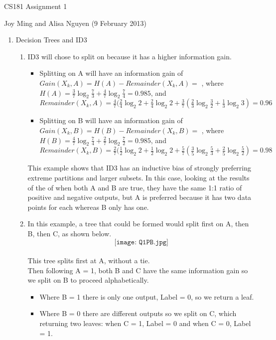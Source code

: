 \documentclass[11pt]{article}
\begin{document}
\begin{center}
\large
CS181 Assignment 1
\end{center}
Joy Ming and Alisa Nguyen (9 February 2013)\\

\begin{enumerate}
\setcounter{enumi}{0}

\item Decision Trees and ID3
\begin{enumerate}
\item ID3 will chose to split on  because it has a higher information gain.
	\begin{itemize}
	\item Splitting on A will have an information gain of $Gain(X_k,A)=H(A)-Remainder(X_k,A)=$ , 
		where $H(A) = \frac{3}{7}\log_2 \frac{7}{3} + \frac{4}{7}\log_2\frac{7}{4}=0.985$, %
		and $Remainder(X_k,A)=\frac{4}{7}(\frac{2}{4}\log_2 2+\frac{2}{4}\log_2 2+\frac{3}{7}(\frac{2}{3}\log_2 \frac{3}{2} + \frac{1}{3}\log_2 3) = 0.96$
	\item Splitting on B will have an information gain of $Gain(X_k,B)=H(B)-Remainder(X_k,B)=$ , 
		where $H(B) = \frac{4}{7}\log_2 \frac{7}{4} + \frac{2}{7}\log_2\frac{7}{2}=0.985$, %
		and $Remainder(X_k,B)=\frac{2}{7}(\frac{1}{2}\log_2 2+\frac{1}{2}\log_2 2+\frac{5}{7}(\frac{3}{5}\log_2 \frac{5}{3} + \frac{2}{5}\log_2 \frac{5}{2})=0.98$
	\end{itemize}
This example shows that ID3 has an inductive bias of strongly preferring extreme partitions and larger subsets. In this case, looking at the results of the of when both A and B are true, they have the same 1:1 ratio of positive and negative outputs, but A is preferred because it has two data points for each whereas B only has one.
\item In this example, a tree that could be formed would split first on A, then B, then C, as shown below.\\
	$$\texttt{[image: Q1PB.jpg]}$$
	\\This tree splits first at A, without a tie.
	\\ Then following A = 1, both B and C have the same information gain so we split on B to proceed alphabetically. 
	\begin{itemize}
	\item Where B = 1 there is only one output, Label = 0, so we return a leaf.  
	\item Where B = 0 there are different outputs so we split on C, which returning two leaves: when C = 1, Label = 0 and when C = 0, Label = 1. 

\end{itemize}
\end{enumerate}
\end{enumerate}
\end{document}
